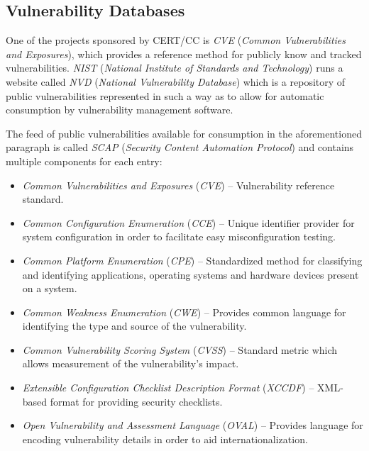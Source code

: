 \documentclass[a4paper,12pt]{article}
\begin{document}
\subsection{Vulnerability Databases}
	
	One of the projects sponsored by CERT/CC is \textit{CVE} (\textit{Common Vulnerabilities and Exposures}), which provides a reference method for publicly know and tracked vulnerabilities. \textit{NIST} (\textit{National Institute of Standards and Technology}) runs a website called \textit{NVD} (\textit{National Vulnerability Database}) which is a repository of public vulnerabilities represented in such a way as to allow for automatic consumption by vulnerability management software\cite{nvd15}.
	
	The feed of public vulnerabilities available for consumption in the aforementioned paragraph is called \textit{SCAP} (\textit{Security Content Automation Protocol}) and contains multiple components for each entry:
	
	\vspace{-0.15in}
	\begin{itemize}
		\item \textit{Common Vulnerabilities and Exposures} (\textit{CVE}) -- Vulnerability reference standard.
		\item \textit{Common Configuration Enumeration} (\textit{CCE}) -- Unique identifier provider for system configuration in order to facilitate easy misconfiguration testing.
		\item \textit{Common Platform Enumeration} (\textit{CPE}) -- Standardized method for classifying and identifying applications, operating systems and hardware devices present on a system.
		\item \textit{Common Weakness Enumeration} (\textit{CWE}) -- Provides common language for identifying the type and source of the vulnerability.
		\item \textit{Common Vulnerability Scoring System} (\textit{CVSS}) -- Standard metric which allows measurement of the vulnerability's impact.
		\item \textit{Extensible Configuration Checklist Description Format} (\textit{XCCDF}) -- XML-based format for providing security checklists.
		\item \textit{Open Vulnerability and Assessment Language} (\textit{OVAL}) -- Provides language for encoding vulnerability details in order to aid internationalization.
	\end{itemize}
	\vspace{-0.15in}
	
\end{document}
